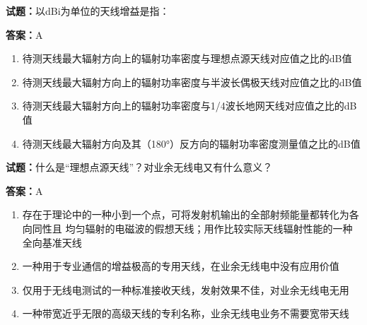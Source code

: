 \documentclass{ctexbook}
\begin{document}




\vspace{1em}

\textbf{试题：}以dBi为单位的天线增益是指： 

\textbf{答案：}A 

\begin{enumerate}[leftmargin=3em]
  \item 待测天线最大辐射方向上的辐射功率密度与理想点源天线对应值之比的dB值 

  \item 待测天线最大辐射方向上的辐射功率密度与半波长偶极天线对应值之比的dB值 

  \item 待测天线最大辐射方向上的辐射功率密度与1/4波长地网天线对应值之比的dB值 

  \item 待测天线最大辐射方向及其（180°）反方向的辐射功率密度测量值之比的dB值 

\end{enumerate}





\vspace{1em}

\textbf{试题：}什么是“理想点源天线”？对业余无线电又有什么意义？ 

\textbf{答案：}A 

\begin{enumerate}[leftmargin=3em]
  \item 存在于理论中的一种小到一个点，可将发射机输出的全部射频能量都转化为各向同性且
均匀辐射的电磁波的假想天线；用作比较实际天线辐射性能的一种全向基准天线 

  \item 一种用于专业通信的增益极高的专用天线，在业余无线电中没有应用价值 

  \item 仅用于无线电测试的一种标准接收天线，发射效果不佳，对业余无线电无用 

  \item 一种带宽近乎无限的高级天线的专利名称，业余无线电业务不需要宽带天线 

\end{enumerate}


\end{document}
